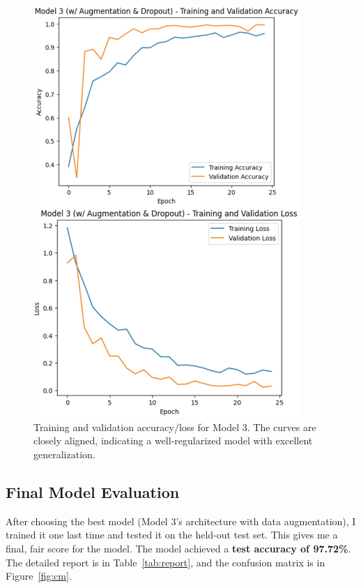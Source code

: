 \documentclass[pdflatex,sn-mathphys-num]{sn-jnl}%
\theoremstyle{thmstyleone}%
\theoremstyle{thmstyletwo}%
\theoremstyle{thmstylethree}%
\begin{document}
\begin{figure}[htbp]
\centering
\includegraphics[width=0.9\textwidth]{model3_curves.png}
\caption{Training and validation accuracy/loss for Model 3. The curves are closely aligned, indicating a well-regularized model with excellent generalization.}\label{fig:model3}
\end{figure}

\subsection{Final Model Evaluation}
After choosing the best model (Model 3's architecture with data augmentation), I trained it one last time and tested it on the held-out test set. This gives me a final, fair score for the model. The model achieved a \textbf{test accuracy of 97.72\%}. The detailed report is in Table~\ref{tab:report}, and the confusion matrix is in Figure~\ref{fig:cm}.
\end{document}
